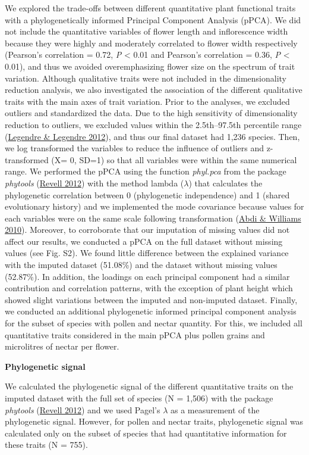 \documentclass[
  12pt,
  a4paper,
]{article}
\begin{document}
We explored the trade-offs between different quantitative plant functional traits with a phylogenetically informed Principal Component Analysis (pPCA). We did not include the quantitative variables of flower length and inflorescence width because they were highly and moderately correlated to flower width respectively (Pearson's correlation = 0.72, \emph{P} \textless{} 0.01 and Pearson's correlation = 0.36, \emph{P} \textless{} 0.01), and thus we avoided overemphasizing flower size on the spectrum of trait variation. Although qualitative traits were not included in the dimensionality reduction analysis, we also investigated the association of the different qualitative traits with the main axes of trait variation. Prior to the analyses, we excluded outliers and standardized the data. Due to the high sensitivity of dimensionality reduction to outliers, we excluded values within the 2.5th--97.5th percentile range (\protect\hyperlink{ref-legendre2012}{Legendre \& Legendre 2012}), and thus our final dataset had 1,236 species. Then, we log transformed the variables to reduce the influence of outliers and z-transformed (X= 0, SD=1) so that all variables were within the same numerical range. We performed the pPCA using the function \emph{phyl.pca} from the package \emph{phytools} (\protect\hyperlink{ref-revell2012}{Revell 2012}) with the method lambda (\(\lambda\)) that calculates the phylogenetic correlation between 0 (phylogenetic independence) and 1 (shared evolutionary history) and we implemented the mode covariance because values for each variables were on the same scale following transformation (\protect\hyperlink{ref-abdi2010}{Abdi \& Williams 2010}). Moreover, to corroborate that our imputation of missing values did not affect our results, we conducted a pPCA on the full dataset without missing values (see Fig. S2). We found little difference between the explained variance with the imputed dataset (51.08\%) and the dataset without missing values (52.87\%). In addition, the loadings on each principal component had a similar contribution and correlation patterns, with the exception of plant height which showed slight variations between the imputed and non-imputed dataset. Finally, we conducted an additional phylogenetic informed principal component analysis for the subset of species with pollen and nectar quantity. For this, we included all quantitative traits considered in the main pPCA plus pollen grains and microlitres of nectar per flower.

\textbf{Phylogenetic signal}

We calculated the phylogenetic signal of the different quantitative traits on the imputed dataset with the full set of species (N = 1,506) with the package \emph{phytools} (\protect\hyperlink{ref-revell2012}{Revell 2012}) and we used Pagel's \(\lambda\) as a measurement of the phylogenetic signal. However, for pollen and nectar traits, phylogenetic signal was calculated only on the subset of species that had quantitative information for these traits (N = 755).
\end{document}
